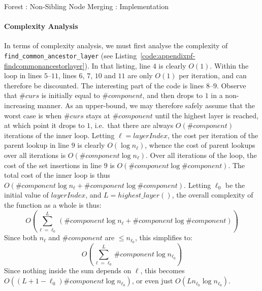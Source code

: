 \begin{stulisting}[p]
\caption{Forest : Non-Sibling Node Merging : Implementation}
\label{code:ipfs-forest-mergenonsiblingnodes}

\end{stulisting}

\paragraph{Complexity Analysis}

In terms of complexity analysis, we must first analyse the complexity of \texttt{find_common_ancestor_layer} (see Listing~\ref{code:appendixpf-findcommonancestorlayer}). In that listing, line $4$ is clearly $O(1)$. Within the loop in lines $5$--$11$, lines $6$, $7$, $10$ and $11$ are only $O(1)$ per iteration, and can therefore be discounted. The interesting part of the code is lines $8$--$9$. Observe that $\#\mathit{curs}$ is initially equal to $\#\mathit{component}$, and then drops to $1$ in a non-increasing manner. As an upper-bound, we may therefore safely assume that the worst case is when $\#\mathit{curs}$ stays at $\#\mathit{component}$ until the highest layer is reached, at which point it drops to $1$, i.e.~that there are always $O(\#\mathit{component})$ iterations of the inner loop. Letting $\ell = \mathit{layerIndex}$, the cost per iteration of the parent lookup in line $9$ is clearly $O(\log n_\ell)$, whence the cost of parent lookups over all iterations is $O(\#\mathit{component} \log n_\ell)$. Over all iterations of the loop, the cost of the set insertions in line $9$ is $O(\#\mathit{component} \log \#\mathit{component})$. The total cost of the inner loop is thus $O(\#\mathit{component} \log n_\ell + \#\mathit{component} \log \#\mathit{component})$. Letting $\ell_0$ be the initial value of $\mathit{layerIndex}$, and $L = \mathit{highest\_layer()}$, the overall complexity of the function as a whole is thus:
%
\[
O\left( \sum_{\ell=\ell_0}^L (\#\mathit{component} \log n_\ell + \#\mathit{component} \log \#\mathit{component}) \right)
\]
%
Since both $n_\ell$ and $\#\mathit{component}$ are $\le n_{\ell_0}$, this simplifies to:
%
\[
O\left( \sum_{\ell=\ell_0}^L \#\mathit{component} \log n_{\ell_0} \right)
\]
%
Since nothing inside the sum depends on $\ell$, this becomes $O((L+1-\ell_0) \#\mathit{component} \log n_{\ell_0})$, or even just $O(L n_{\ell_0} \log n_{\ell_0})$.

